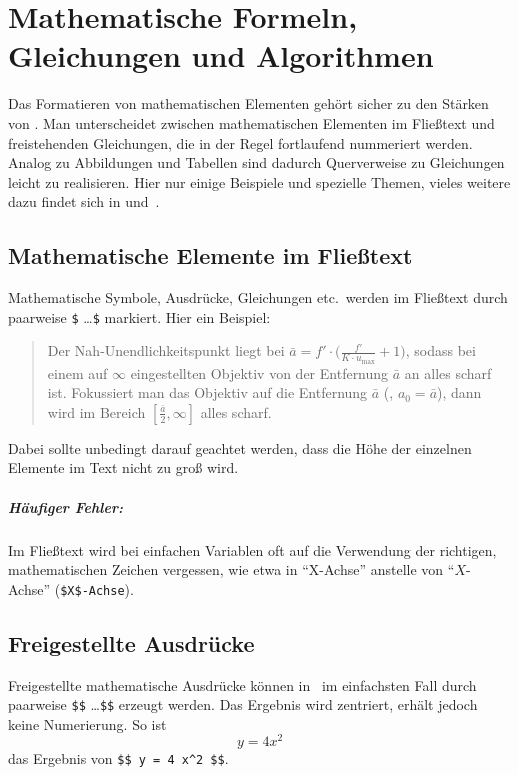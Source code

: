 \chapter[Mathem.\ Formeln etc.]{Mathematische Formeln, Gleichungen und Algorithmen}
\label{chap:Mathematik}



Das Formatieren von mathematischen Elementen gehört sicher zu den
Stär\-ken von \latex. Man unterscheidet zwischen mathematischen Elementen
im Fließtext und freistehenden Gleichungen, die in der Regel
fortlaufend nummeriert werden. Analog zu Abbildungen und Tabellen sind dadurch
Querverweise zu Gleichungen leicht zu realisieren.
Hier nur einige Beispiele und spezielle Themen, vieles weitere dazu findet sich \zB in
\cite[Kap.\ 7]{Kopka2003} und~\cite{mathmode10}.


\section{Mathematische Elemente im Fließtext}

Mathematische Symbole, Ausdrücke, Gleichungen etc.\ werden im Fließtext durch paarweise 
\verb!$! \ldots \verb!$! markiert. Hier ein Beispiel:
%
\begin{quote}
Der Nah-Unendlichkeitspunkt liegt bei
$\bar{a} = f' \cdot \bigl( \frac{f'}{K \cdot u_{\max}} + 1 \bigr)$,
sodass bei einem auf $\infty$ eingestellten Objektiv von der Entfernung
$\bar{a}$ an alles scharf ist. Fokussiert man das
Objektiv auf die Entfernung $\bar{a}$ (\dah, $a_0 = \bar{a}$), dann wird
im Bereich $[\frac{\bar{a}}{2}, \infty]$ alles scharf.
\end{quote}
%
Dabei sollte unbedingt darauf geachtet werden, dass die Höhe der einzelnen Elemente im Text nicht zu groß wird. 

\paragraph{Häufiger Fehler:} 
Im Fließtext wird bei einfachen Variablen oft auf die Verwendung der richtigen, mathematischen Zeichen vergessen, wie etwa in 
"`X-Achse"' anstelle von "`$X$-Achse"' (\verb!$X$-Achse!).



\section{Freigestellte Ausdrücke}

Freigestellte mathematische Ausdrücke können in \latex\ im einfachsten Fall durch paarweise \verb!$$! \ldots \verb!$$! erzeugt werden. Das Ergebnis wird zentriert, erhält jedoch keine Numerierung. So ist \zB\ $$ y = 4 x^2 $$ das Ergebnis von \verb!$$ y = 4 x^2 $$!.

